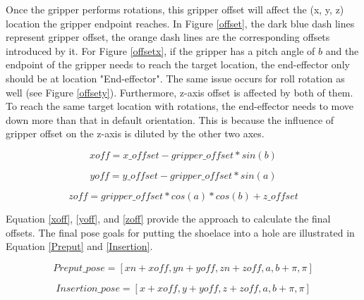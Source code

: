 Once the gripper performs rotations, this gripper offset will affect the (x, y, z) location the gripper endpoint reaches. In Figure \ref{offset}, the dark blue dash lines represent gripper offset, the orange dash lines are the corresponding offsets introduced by it. For Figure \ref{offsetx}, if the gripper has a pitch angle of $b$ and the endpoint of the gripper needs to reach the target location, the end-effector only should be at location "End-effector". The same issue occurs for roll rotation as well (see Figure \ref{offsety}). Furthermore, z-axis offset is affected by both of them. To reach the same target location with rotations, the end-effector needs to move down more than that in default orientation. This is because the influence of gripper offset on the z-axis is diluted by the other two axes.

\begin{equation}
xoff = x\_offset - gripper\_offset*sin(b)
\label{xoff}
\end{equation}

\begin{equation}
yoff = y\_offset - gripper\_offset*sin(a)
\label{yoff}
\end{equation}

\begin{equation}
zoff = gripper\_offset*cos(a)*cos(b) + z\_offset
\label{zoff}
\end{equation}

Equation \ref{xoff}, \ref{yoff}, and \ref{zoff} provide the approach to calculate the final offsets. The final pose goals for putting the shoelace into a hole are illustrated in Equation \ref{Preput} and \ref{Insertion}.

\begin{equation}
Preput\_pose = [xn + xoff, yn + yoff, zn + zoff, a, b + \pi, \pi]
\label{Preput}
\end{equation} 

\begin{equation}
Insertion\_pose = [x + xoff, y + yoff, z + zoff, a, b + \pi, \pi]
\label{Insertion}
\end{equation} 

